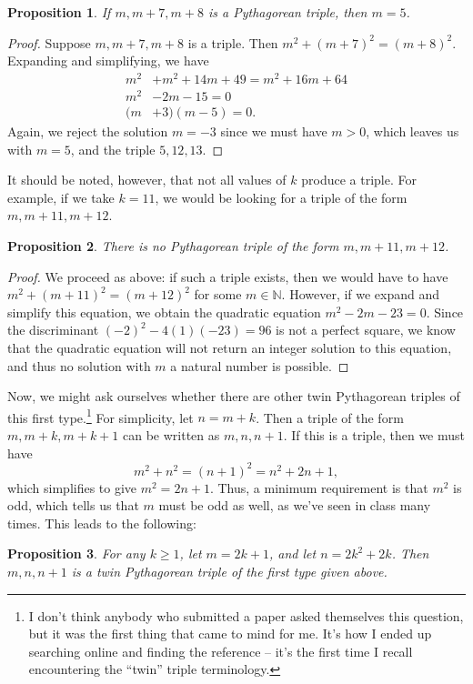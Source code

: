 \documentclass[letterpaper,12pt]{article}
\newtheorem{prop}{Proposition}
\theoremstyle{definition}
\begin{document}
\begin{prop}
 If $m,m+7,m+8$ is a Pythagorean triple, then $m=5$.
\end{prop}
\begin{proof}
 Suppose $m,m+7,m+8$ is a triple. Then $m^2+(m+7)^2=(m+8)^2$. Expanding and simplifying, we have
\begin{align*}
 m^2 &+ m^2+14m+49 = m^2+16m+64\\
 m^2 &-2m-15 = 0\\
 (m& +3)(m-5)=0.
\end{align*}
Again, we reject the solution $m=-3$ since we must have $m>0$, which leaves us with $m=5$, and the triple $5,12,13$.
\end{proof}
It should be noted, however, that not all values of $k$ produce a triple. For example, if we take $k=11$, we would be looking for a triple of the form $m,m+11,m+12$.
\begin{prop}
 There is no Pythagorean triple of the form $m, m+11, m+12$.
\end{prop}
\begin{proof}
 We proceed as above: if such a triple exists, then we would have to have $m^2+(m+11)^2=(m+12)^2$ for some $m\in\mathbb{N}$. However, if we expand and simplify this equation, we obtain the quadratic equation $m^2-2m-23=0$. Since the discriminant $(-2)^2-4(1)(-23) = 96$ is not a perfect square, we know that the quadratic equation will not return an integer solution to this equation, and thus no solution with $m$ a natural number is possible.
\end{proof}
Now, we might ask ourselves whether there are other twin Pythagorean triples of this first type.\footnote{I don't think anybody who submitted a paper asked themselves this question, but it was the first thing that came to mind for me. It's how I ended up searching online and finding the reference \cite{MW} -- it's the first time I recall encountering the ``twin'' triple terminology.} For simplicity, let $n=m+k$. Then a triple of the form $m, m+k, m+k+1$ can be written as $m,n,n+1$. If this is a triple, then we must have
\[
 m^2+n^2 = (n+1)^2 = n^2+2n+1,
\]
which simplifies to give $m^2=2n+1$. Thus, a minimum requirement is that $m^2$ is odd, which tells us that $m$ must be odd as well, as we've seen in class many times. This leads to the following:
\begin{prop}
 For any $k\geq 1$, let $m=2k+1$, and let $n=2k^2+2k$. Then $m,n,n+1$ is a twin Pythagorean triple of the first type given above.
\end{prop}
\end{document}

